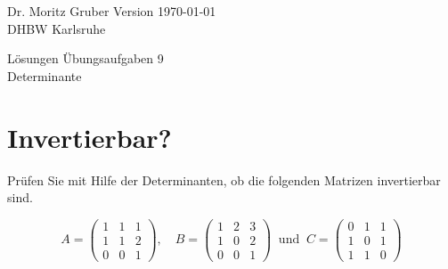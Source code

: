 




\vspace*{-20mm}
{
	\color{dhbwGray}
	Dr. Moritz Gruber	\hfill Version \today\\
	DHBW Karlsruhe\\
}

\vspace{10mm}
\begin{center}
	{
		\color{lightBlue}
		{ \LARGE L\"osungen Übungsaufgaben 9}\\[3mm]
		{\Large Determinante}
	}
\end{center}

\vspace{5mm}



\section{Invertierbar?}

Prüfen Sie mit Hilfe der Determinanten, ob die folgenden Matrizen invertierbar sind.

$$
A=\begin{pmatrix} 1 & 1 & 1 \\ 1 & 1 &2 \\ 0&0&1\end{pmatrix}, \quad 
B=\begin{pmatrix} 1 & 2 & 3 \\ 1 & 0 &2 \\ 0&0&1\end{pmatrix} \ \text{ und } \
C=\begin{pmatrix} 0 & 1 & 1 \\ 1 & 0 &1 \\ 1&1&0\end{pmatrix}
$$
